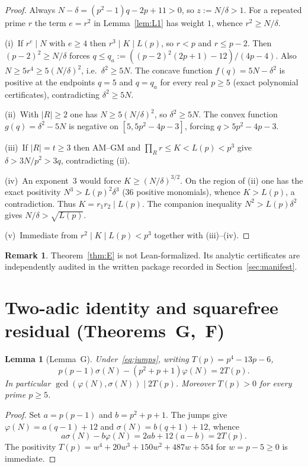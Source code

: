 \documentclass[11pt,reqno]{amsart}
\newcommand{\ph}{\varphi}
\newcommand{\sig}{\sigma}
\newtheorem{lemma}[theorem]{Lemma}
\theoremstyle{definition}
\newtheorem{remark}[theorem]{Remark}
\begin{document}
\begin{proof}
Always \(N-\delta=(p^2-1)q-2p+11>0\), so \(z:=N/\delta>1\). For a repeated prime \(r\) the term \(e=r^2\) in Lemma~\ref{lem:L1} has weight \(1\), whence \(r^2\ge N/\delta\).

(i)~If \(r^e\mid N\) with \(e\ge 4\) then \(r^3\mid K\mid L(p)\), so \(r<p\) and \(r\le p-2\). Then \((p-2)^2\ge N/\delta\) forces \(q\le q_a:=((p-2)^2(2p+1)-12)/(4p-4)\). Also \(N\ge 5r^4\ge 5(N/\delta)^2\), i.e.\ \(\delta^2\ge 5N\). The concave function \(f(q)=5N-\delta^2\) is positive at the endpoints \(q=5\) and \(q=q_a\) for every real \(p\ge 5\) (exact polynomial certificates), contradicting \(\delta^2\ge 5N\).

(ii)~With \(|R|\ge 2\) one has \(N\ge 5(N/\delta)^2\), so \(\delta^2\ge 5N\). The convex function \(g(q)=\delta^2-5N\) is negative on \([5,5p^2-4p-3]\), forcing \(q>5p^2-4p-3\).

(iii)~If \(|R|=t\ge 3\) then AM--GM and \(\prod_R r\le K<L(p)<p^3\) give \(\delta>3N/p^2>3q\), contradicting (ii).

(iv)~An exponent~3 would force \(K\ge(N/\delta)^{3/2}\). On the region of (ii) one has the exact positivity \(N^3>L(p)^2\delta^3\) (36 positive monomials), whence \(K>L(p)\), a contradiction. Thus \(K=r_1r_2\mid L(p)\). The companion inequality \(N^2>L(p)\delta^2\) gives \(N/\delta>\sqrt{L(p)}\).

(v)~Immediate from \(r^2\mid K\mid L(p)<p^3\) together with (iii)--(iv).
\end{proof}

\begin{remark}
Theorem~\ref{thm:E} is not Lean-formalized. Its analytic certificates are independently audited in the written package recorded in Section~\ref{sec:manifest}.
\end{remark}

\section{Two-adic identity and squarefree residual (Theorems~G,~F)}
\label{sec:thmF}

\begin{lemma}[Lemma~G]
\label{lem:G}
Under~\eqref{eq:jumps}, writing \(T(p)=p^4-13p-6\),
\[
p(p-1)\sig(N)-(p^2+p+1)\ph(N)=2T(p).
\]
In particular \(\gcd(\ph(N),\sig(N))\mid 2T(p)\). Moreover \(T(p)>0\) for every prime \(p\ge 5\).
\end{lemma}

\begin{proof}
Set \(a=p(p-1)\) and \(b=p^2+p+1\). The jumps give \(\ph(N)=a(q-1)+12\) and \(\sig(N)=b(q+1)+12\), whence
\[
a\sig(N)-b\ph(N)=2ab+12(a-b)=2T(p).
\]
The positivity \(T(p)=w^4+20w^3+150w^2+487w+554\) for \(w=p-5\ge 0\) is immediate.
\end{proof}
\end{document}
